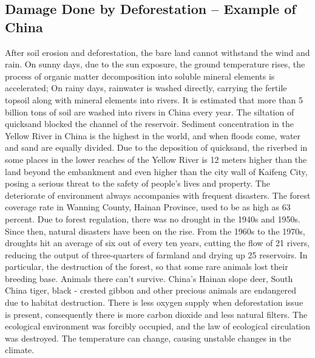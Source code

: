 \documentclass{book}\usepackage{knitr}
\begin{document}
\begin{knitrout}
\begin{kframe}
\section{Damage Done by Deforestation – Example of China}
After soil erosion and deforestation, the bare land cannot withstand the wind and rain. On sunny days, due to the sun exposure, the ground temperature rises, the process of organic matter decomposition into soluble mineral elements is accelerated; On rainy days, rainwater is washed directly, carrying the fertile topsoil along with mineral elements into rivers. It is estimated that more than 5 billion tons of soil are washed into rivers in China every year. The siltation of quicksand blocked the channel of the reservoir. Sediment concentration in the Yellow River in China is the highest in the world, and when floods come, water and sand are equally divided. Due to the deposition of quicksand, the riverbed in some places in the lower reaches of the Yellow River is 12 meters higher than the land beyond the embankment and even higher than the city wall of Kaifeng City, posing a serious threat to the safety of people's lives and property.
The deteriorate of environment always accompanies with frequent disasters. The forest coverage rate in Wanning County, Hainan Province, used to be as high as 63 percent. Due to forest regulation, there was no drought in the 1940s and 1950s. Since then, natural disasters have been on the rise. From the 1960s to the 1970s, droughts hit an average of six out of every ten years, cutting the flow of 21 rivers, reducing the output of three-quarters of farmland and drying up 25 reservoirs. In particular, the destruction of the forest, so that some rare animals lost their breeding base. Animals there can't survive. China's Hainan slope deer, South China tiger, black - crested gibbon and other precious animals are endangered due to habitat destruction. There is less oxygen supply when deforestation issue is present, consequently there is more carbon dioxide and less natural filters. The ecological environment was forcibly occupied, and the law of ecological circulation was destroyed. The temperature can change, causing unstable changes in the climate.


\end{kframe}
\end{knitrout}
\end{document}
